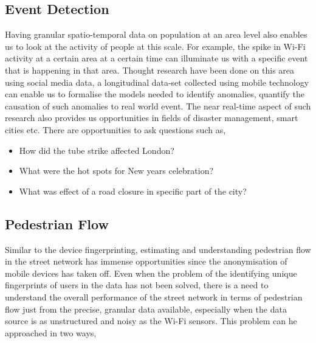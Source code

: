 \subsection{Event Detection}


Having granular spatio-temporal data on population at an area level also enables us to look at the activity of people at this scale.
For example, the spike in Wi-Fi activity at a certain area at a certain time can illuminate us with a specific event that is happening in that area.
Thought research have been done on this area using social media data, a longitudinal data-set collected using mobile technology can enable us to formalise the models needed to identify anomalies, quantify the causation of such anomalies to real world event.
The near real-time aspect of such research also provides us opportunities in fields of disaster management, smart cities etc. 
There are opportunities to ask questions such as,

\begin{itemize}
  \setlength{\itemindent}{2em}
  \itemsep-0.25em
  \item How did the tube strike affected London?
  \item What were the hot spots for New years celebration?
  \item What was effect of a road closure in specific part of the city?
\end{itemize}

\subsection{Pedestrian Flow}

Similar to the device fingerprinting, estimating and understanding pedestrian flow in the street network has immense opportunities since the anonymisation of mobile devices has taken off.
Even when the problem of the identifying unique fingerprints of users in the data has not been solved, there is a need to understand the overall performance of the street network in terms of pedestrian flow just from the precise, granular data available, especially when the data source is as unstructured and noisy as the Wi-Fi sensors.
This problem can he approached in two ways,

